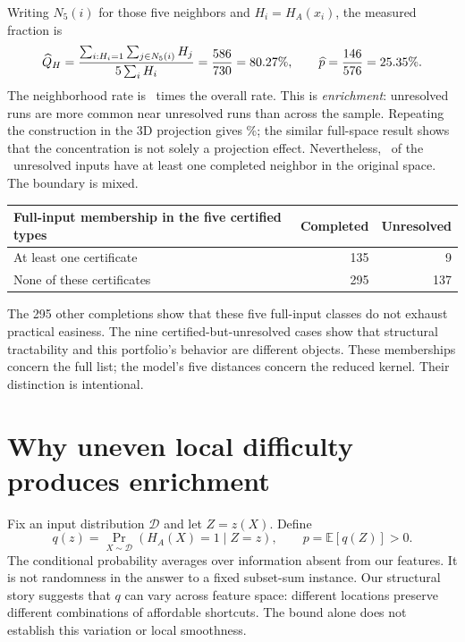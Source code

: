 \documentclass[11pt,english]{article}
\newcommand{\E}{\mathbb E}
\begin{document}
Writing \(N_5(i)\) for those five neighbors and \(H_i=H_A(x_i)\), the measured fraction is
\begin{equation}
 \widehat Q_H=
 \frac{\sum_{i:H_i=1}\sum_{j\in N_5(i)}H_j}{5\sum_i H_i}
 =\frac{586}{730}=80.27\%,
 \qquad \widehat p=\frac{146}{576}=25.35\%.
 \label{eq:observed}
\end{equation}
The neighborhood rate is \ClusterEnrichment\ times the overall rate. This is \emph{enrichment}: unresolved runs are more common near unresolved runs than across the sample. Repeating the construction in the 3D projection gives \ClusterPcaRate\%; the similar full-space result shows that the concentration is not solely a projection effect. Nevertheless, \ClusterMixed\ of the \ClusterHard\ unresolved inputs have at least one completed neighbor in the original space. The boundary is mixed.

\begin{center}
\small
\begin{tabular}{@{}lrr@{}}
\toprule
Full-input membership in the five certified types & Completed & Unresolved\\
\midrule
At least one certificate & 135 & 9\\
None of these certificates & 295 & 137\\
\bottomrule
\end{tabular}
\end{center}
The 295 other completions show that these five full-input classes do not exhaust practical easiness. The nine certified-but-unresolved cases show that structural tractability and this portfolio's behavior are different objects. These memberships concern the full list; the model's five distances concern the reduced kernel. Their distinction is intentional.

\newpage
\section{Why uneven local difficulty produces enrichment}
Fix an input distribution \(\mathcal D\) and let \(Z=z(X)\). Define
\[
 q(z)=\Pr_{X\sim\mathcal D}(H_A(X)=1\mid Z=z),
 \qquad p=\E[q(Z)]>0.
\]
The conditional probability averages over information absent from our features. It is not randomness in the answer to a fixed subset-sum instance. Our structural story suggests that \(q\) can vary across feature space: different locations preserve different combinations of affordable shortcuts. The bound alone does not establish this variation or local smoothness.
\end{document}
